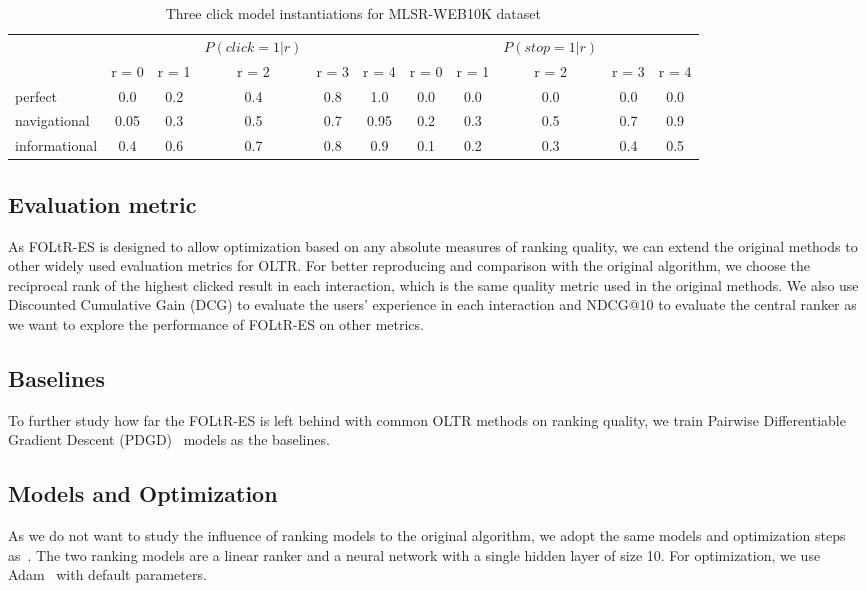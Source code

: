 \begin{table}
	\caption{Three click model instantiations for MLSR-WEB10K dataset}
	\label{table:3:MLSR-WEB10K}
	\centering
	\begin{tabular}{l c c c c c c c c c c}
		\hline
		&&&$P(click = 1 | r)$ &&&&& $P(stop = 1 | r)$  && \\
		& r = 0&  r = 1  & r = 2 & r = 3 & r = 4 & r = 0&  r = 1  & r = 2 & r = 3 & r = 4\\
		\midrule
		perfect  &   0.0  &    0.2  &   0.4  & 0.8 & 1.0 & 0.0 & 0.0 & 0.0 & 0.0 & 0.0 \\
		navigational  &  0.05  &   0.3  &    0.5  & 0.7 & 0.95 & 0.2  & 0.3  & 0.5  & 0.7 & 0.9  \\
		informational  &   0.4 &   0.6  &   0.7 & 0.8 & 0.9  & 0.1  & 0.2 & 0.3 & 0.4 & 0.5 \\
		\hline
	\end{tabular}
\end{table}

\subsection{Evaluation metric}
As FOLtR-ES is designed to allow optimization based on any absolute measures of ranking quality, we can extend the original methods to other widely used evaluation metrics for OLTR. For better reproducing and comparison with the original algorithm, we choose the reciprocal rank of the highest clicked result in each interaction, which is the same quality metric used in the original methods. We also use Discounted Cumulative Gain (DCG) to evaluate the users' experience in each interaction and NDCG@10 to evaluate the central ranker as we want to explore the performance of FOLtR-ES on other metrics.

\subsection{Baselines}
To further study how far the FOLtR-ES is left behind with common OLTR methods on ranking quality, we train Pairwise Differentiable Gradient Descent (PDGD)~\cite{oosterhuis2018differentiable} models as the baselines.

\subsection{Models and Optimization}
As we do not want to study the influence of ranking models to the original algorithm, we adopt the same models and optimization steps as~\cite{kharitonov2019federated}. The two ranking models are a linear ranker and a neural network with a single hidden layer of size 10. For optimization, we use Adam~\cite{kingma2014adam} with default parameters.


